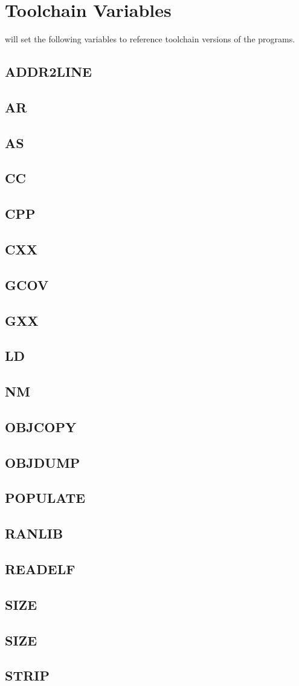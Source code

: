 \section{Toolchain Variables}

\lmsbw will set the following variables to reference toolchain
versions of the programs.

\subsection{ADDR2LINE}
\subsection{AR}
\subsection{AS}
\subsection{CC}
\subsection{CPP}
\subsection{CXX}
\subsection{GCOV}
\subsection{GXX}
\subsection{LD}
\subsection{NM}
\subsection{OBJCOPY}
\subsection{OBJDUMP}
\subsection{POPULATE}
\subsection{RANLIB}
\subsection{READELF}
\subsection{SIZE}
\subsection{SIZE}
\subsection{STRIP}

